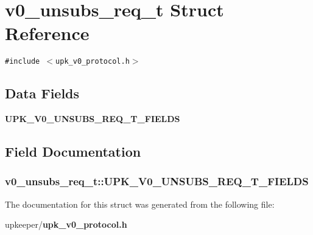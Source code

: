 \section{v0\_\-unsubs\_\-req\_\-t Struct Reference}
\label{structv0__unsubs__req__t}
{\tt \#include $<$upk\_\-v0\_\-protocol.h$>$}

\subsection*{Data Fields}
\begin{CompactItemize}
\item 
\bf{UPK\_\-V0\_\-UNSUBS\_\-REQ\_\-T\_\-FIELDS}
\end{CompactItemize}


\subsection{Field Documentation}
\subsubsection{\setlength{\rightskip}{0pt plus 5cm}\bf{v0\_\-unsubs\_\-req\_\-t::UPK\_\-V0\_\-UNSUBS\_\-REQ\_\-T\_\-FIELDS}}\label{structv0__unsubs__req__t_ea2b6245bd965101662b22b0c422fec9}




The documentation for this struct was generated from the following file:\begin{CompactItemize}
\item 
upkeeper/\bf{upk\_\-v0\_\-protocol.h}\end{CompactItemize}
